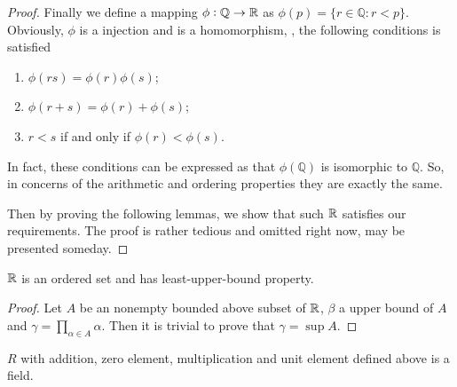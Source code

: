 \begin{proof}
Finally we define a mapping $\phi: \mathbb{Q} \to \mathbb{R}$ as 
$\phi(p) = \{r \in \mathbb{Q} : r < p\}$. Obviously, $\phi$ is a 
injection and is a homomorphism, \ie, the following conditions is 
satisfied
\begin{enumerate}
\item $\phi(rs) = \phi(r)\phi(s)$;
\item $\phi(r+s) = \phi(r) + \phi(s)$;
\item $r < s$ if and only if $\phi(r) < \phi(s)$.
\end{enumerate}
In fact, these conditions can be expressed as that $\phi(\mathbb{Q})$ is
isomorphic to $\mathbb{Q}$. So, in concerns of the arithmetic and 
ordering properties they are exactly the same.

Then by proving the following lemmas, we show that such $\mathbb{R}$ 
satisfies our requirements. The proof is rather tedious and omitted 
right now, may be presented someday.
\end{proof}

\begin{lemma}
$\mathbb{R}$ is an ordered set and has least-upper-bound property.
\end{lemma}
\begin{proof}
Let $A$ be an nonempty bounded above subset of $\mathbb{R}$, $\beta$ a 
upper bound of $A$ and $\gamma = \prod_{\alpha \in A} \alpha$. Then 
it is trivial to prove that $\gamma = \sup A$.
\end{proof}

\begin{lemma}
$R$ with addition, zero element, multiplication and unit element 
defined above is a field.
\end{lemma}